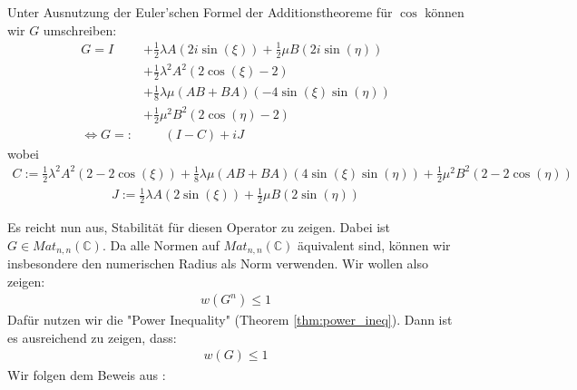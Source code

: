 Unter Ausnutzung der Euler'schen Formel der Additionstheoreme für $\cos$ können wir $G$ umschreiben:
\begin{align}
    G = I 
    & + \frac{1}{2} \lambda A (2i \sin(\xi))+ \frac{1}{2} \mu B (2i \sin(\eta)) \nonumber \\
    & + \frac{1}{2} \lambda^2 A^2 (2 \cos(\xi) - 2) \nonumber \\
    & + \frac{1}{8} \lambda \mu  (AB+BA) (-4 \sin(\xi)\sin(\eta)) \nonumber \\
    & + \frac{1}{2} \mu^2 B^2 (2 \cos(\eta) - 2 ) \\
    \Leftrightarrow G =: & \phantom{ I + } (I-C) +iJ \nonumber
\end{align}
wobei
\begin{align*}
    C := \frac{1}{2} \lambda^2 A^2 (2 - 2 \cos(\xi))  + \frac{1}{8} \lambda \mu  (AB+BA) (4 \sin(\xi)\sin(\eta)) + \frac{1}{2} \mu^2 B^2 (2 - 2 \cos(\eta) )
\end{align*}
\begin{align*}
    J := \frac{1}{2} \lambda A (2 \sin(\xi))+ \frac{1}{2} \mu B (2 \sin(\eta))
\end{align*}
    

Es reicht nun aus, Stabilität für diesen Operator zu zeigen. Dabei ist $G \in Mat_{n,n}(\mathbb{C})$. Da alle Normen auf $Mat_{n,n}(\mathbb{C})$ äquivalent sind, können wir insbesondere den numerischen Radius als Norm verwenden. Wir wollen also zeigen:
\begin{align}
    w(G^n) \le 1
\end{align}
Dafür nutzen wir die "Power Inequality" (Theorem \ref{thm:power_ineq}). Dann ist es ausreichend zu zeigen, dass:
\begin{align}
    w(G)  \le 1
\end{align}
Wir folgen dem Beweis aus \parencite[][Theorem 4.5-1]{goldberg1982numerical}:

